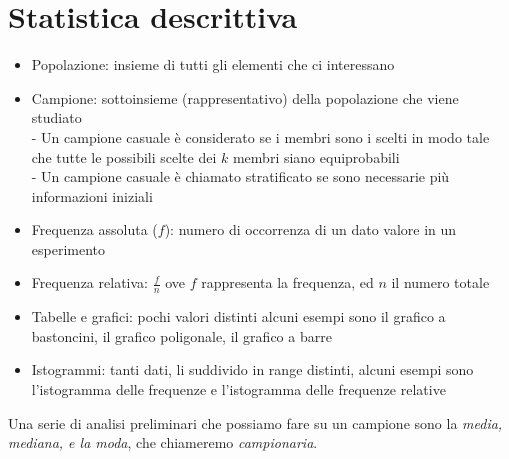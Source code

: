 %
%
%
%

\graphicspath{ {./images/} } 	




\section{Statistica descrittiva}
\begin{itemize}
\item Popolazione: insieme di tutti gli elementi che ci interessano
\item Campione: sottoinsieme (rappresentativo) della popolazione che viene studiato\\
		- Un campione casuale è considerato se i membri sono i scelti in modo tale che tutte le possibili scelte dei $k$ membri siano equiprobabili\\
		- Un campione casuale è chiamato stratificato se sono necessarie più informazioni iniziali
\item Frequenza assoluta ($f$): numero di occorrenza di un dato valore in un esperimento
\item Frequenza relativa: $\frac{f}{n}$ ove $f$ rappresenta la frequenza, ed $n$ il numero totale
\item Tabelle e grafici: pochi valori distinti alcuni esempi sono il grafico a bastoncini, il grafico poligonale, il grafico a barre
\item Istogrammi: tanti dati, li suddivido in range distinti, alcuni esempi sono l'istogramma delle frequenze e l'istogramma delle frequenze relative
\end{itemize}
Una serie di analisi preliminari che possiamo fare su un campione sono la \emph{media, mediana, e la moda}, che chiameremo \emph{campionaria}. 

